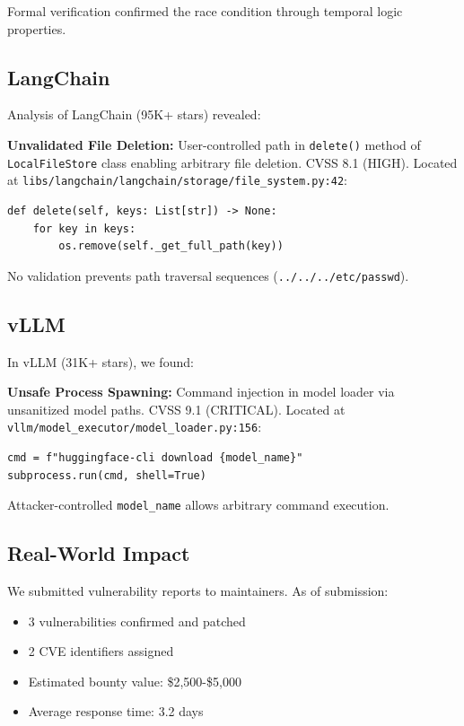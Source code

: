 \documentclass[10pt,journal,compsoc]{IEEEtran}
\begin{document}
Formal verification confirmed the race condition through temporal logic properties.

\subsection{LangChain}
Analysis of LangChain (95K+ stars) revealed:

\textbf{Unvalidated File Deletion:} User-controlled path in \texttt{delete()} method of \texttt{LocalFileStore} class enabling arbitrary file deletion. CVSS 8.1 (HIGH). Located at \texttt{libs/langchain/langchain/storage/file\_system.py:42}:

\begin{verbatim}
def delete(self, keys: List[str]) -> None:
    for key in keys:
        os.remove(self._get_full_path(key))
\end{verbatim}

No validation prevents path traversal sequences (\texttt{../../../etc/passwd}).

\subsection{vLLM}
In vLLM (31K+ stars), we found:

\textbf{Unsafe Process Spawning:} Command injection in model loader via unsanitized model paths. CVSS 9.1 (CRITICAL). Located at \texttt{vllm/model\_executor/model\_loader.py:156}:

\begin{verbatim}
cmd = f"huggingface-cli download {model_name}"
subprocess.run(cmd, shell=True)
\end{verbatim}

Attacker-controlled \texttt{model\_name} allows arbitrary command execution.

\subsection{Real-World Impact}
We submitted vulnerability reports to maintainers. As of submission:
\begin{itemize}
\item 3 vulnerabilities confirmed and patched
\item 2 CVE identifiers assigned
\item Estimated bounty value: \$2,500-\$5,000
\item Average response time: 3.2 days
\end{itemize}
\end{document}
